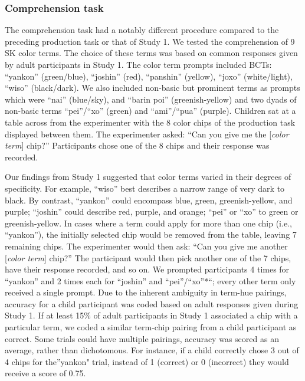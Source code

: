 \documentclass[
  english,
  ,man,floatsintext]{apa6}
\begin{document}
\hypertarget{comprehension-task}{%
\subsubsection{Comprehension task}\label{comprehension-task}}

The comprehension task had a notably different procedure compared to the preceding production task or that of Study 1. We tested the comprehension of 9 SK color terms. The choice of these terms was based on common responses given by adult participants in Study 1. The color term prompts included BCTs: \enquote{yankon} (green/blue), \enquote{joshin} (red), \enquote{panshin} (yellow), \enquote{joxo} (white/light), \enquote{wiso} (black/dark). We also included non-basic but prominent terms as prompts which were \enquote{nai} (blue/sky), and \enquote{barin poi} (greenish-yellow) and two dyads of non-basic terms \enquote{pei}/\enquote{xo} (green) and \enquote{ami}/\enquote{pua} (purple). Children sat at a table across from the experimenter with the 8 color chips of the production task displayed between them. The experimenter asked: \enquote{Can you give me the {[}\emph{color term}{]} chip?} Participants chose one of the 8 chips and their response was recorded.

Our findings from Study 1 suggested that color terms varied in their degrees of specificity. For example, \enquote{wiso} best describes a narrow range of very dark to black. By contrast, \enquote{yankon} could encompass blue, green, greenish-yellow, and purple; \enquote{joshin} could describe red, purple, and orange; \enquote{pei} or \enquote{xo} to green or greenish-yellow. In cases where a term could apply for more than one chip (i.e., \enquote{yankon}), the initially selected chip would be removed from the table, leaving 7 remaining chips. The experimenter would then ask: \enquote{Can you give me another {[}\emph{color term}{]} chip?} The participant would then pick another one of the 7 chips, have their response recorded, and so on. We prompted participants 4 times for \enquote{yankon} and 2 times each for \enquote{joshin} and \enquote{pei}/\enquote{xo}*\enquote{; every other term only received a single prompt. Due to the inherent ambiguity in term-hue pairings, accuracy for a child participant was coded based on adult responses given during Study 1. If at least 15\% of adult participants in Study 1 associated a chip with a particular term, we coded a similar term-chip pairing from a child participant as correct. Some trials could have multiple pairings, accuracy was scored as an average, rather than dichotomous. For instance, if a child correctly chose 3 out of 4 chips for the}yankon" trial, instead of 1 (correct) or 0 (incorrect) they would receive a score of 0.75.
\end{document}
